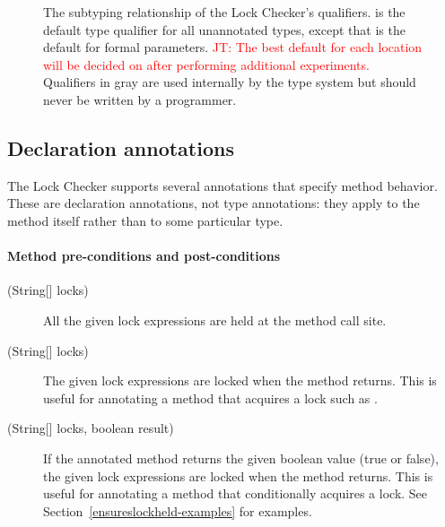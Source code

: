 \begin{figure}
\caption{The subtyping relationship of the Lock Checker's qualifiers.
 is the default type qualifier for all unannotated
types, except that  is the default for formal parameters.
\textcolor{red}{JT: The best default for each location will be decided on after performing
additional experiments.}
Qualifiers in gray
are used internally by the type system but should never be written by a
programmer.
}
\label{fig-lock-guardedby-hierarchy}
\end{figure}


\subsection{Declaration annotations\label{lock-declaration-annotations}}

The Lock Checker supports several annotations that specify method behavior.
These are declaration annotations, not type annotations: they apply to the
method itself rather than to some particular type.

\paragraph{Method pre-conditions and post-conditions}

\begin{description}
\item[\small{(String[] locks)}]
  All the given lock expressions
  are held at the method call site.

\item[\small{(String[] locks)}]
  The given lock
  expressions are
  locked when the method returns.  This is useful for annotating a
  method that acquires a lock such as
  .

\item[\small{(String[] locks, boolean result)}]
  If the annotated method returns the given
  boolean value (true or false), the given lock
  expressions are locked when the method returns.
  This is useful for annotating a
  method that conditionally acquires a lock.
  See Section~\ref{ensureslockheld-examples} for examples.

\end{description}

